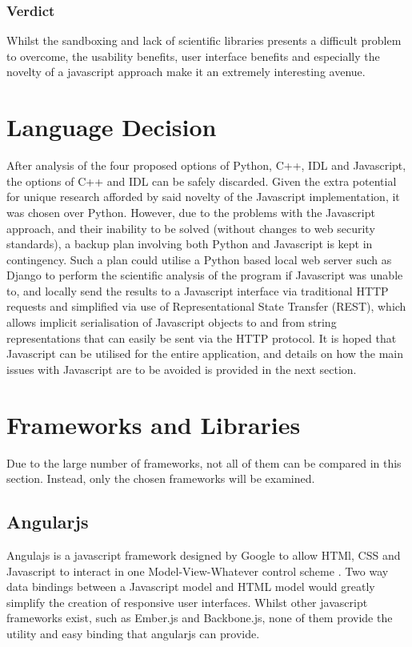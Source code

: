 \documentclass[titlesmallcaps, examinerscopy, copyrightpage]{uqthesis}
\begin{document}
\subsubsection{Verdict}

Whilst the sandboxing and lack of scientific libraries presents a difficult problem to overcome, the usability benefits, user interface benefits and especially the novelty of a javascript approach make it an extremely interesting avenue.


\section{Language Decision}

After analysis of the four proposed options of Python, C++, IDL and Javascript, the options of C++ and IDL can be safely discarded. Given the extra potential for unique research afforded by said novelty of the Javascript implementation, it was chosen over Python. However, due to the problems with the Javascript approach, and their inability to be solved (without changes to web security standards), a backup plan involving both Python and Javascript is kept in contingency. Such a plan could utilise a Python based local web server such as Django to perform the scientific analysis of the program if Javascript was unable to, and locally send the results to a Javascript interface via traditional HTTP requests and simplified via use of Representational State Transfer (REST), which allows implicit serialisation of Javascript objects to and from string representations that can easily be sent via the HTTP protocol. It is hoped that Javascript can be utilised for the entire application, and details on how the main issues with Javascript are to be avoided is provided in the next section.


\section{Frameworks and Libraries}

Due to the large number of frameworks, not all of them can be compared in this section. Instead, only the chosen frameworks will be examined.

\subsection{Angularjs}

Angulajs is a javascript framework designed by Google to allow HTMl, CSS and Javascript to interact in one Model-View-Whatever control scheme \cite{angularjs}. Two way data bindings between a Javascript model and HTML model would greatly simplify the creation of responsive user interfaces. Whilst other javascript frameworks exist, such as Ember.js and Backbone.js, none of them provide the utility and easy binding that angularjs can provide.
\end{document}
